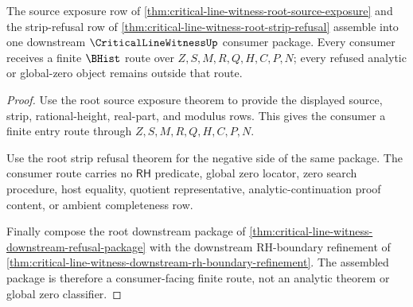 \begin{theorem}
\label{thm:critical-line-witness-root-consumer-package}
The source exposure row of \autoref{thm:critical-line-witness-root-source-exposure} and the strip-refusal row of \autoref{thm:critical-line-witness-root-strip-refusal} assemble into one downstream $\CriticalLineWitnessUp$ consumer package. Every consumer receives a finite $\BHist$ route over $Z,S,M,R,Q,H,C,P,N$; every refused analytic or global-zero object remains outside that route.
\end{theorem}
\begin{proof}
Use the root source exposure theorem to provide the displayed source, strip, rational-height, real-part, and modulus rows. This gives the consumer a finite entry route through $Z,S,M,R,Q,H,C,P,N$.

Use the root strip refusal theorem for the negative side of the same package. The consumer route carries no $\mathsf{RH}$ predicate, global zero locator, zero search procedure, host equality, quotient representative, analytic-continuation proof content, or ambient completeness row.

Finally compose the root downstream package of \autoref{thm:critical-line-witness-downstream-refusal-package} with the downstream RH-boundary refinement of \autoref{thm:critical-line-witness-downstream-rh-boundary-refinement}. The assembled package is therefore a consumer-facing finite route, not an analytic theorem or global zero classifier.
\end{proof}
